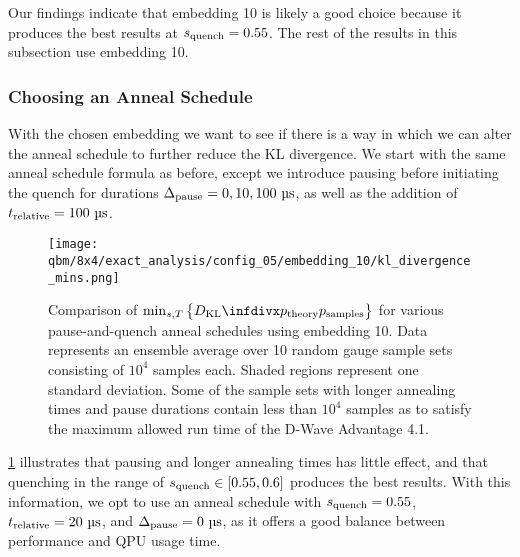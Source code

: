 Our findings indicate that embedding 10 is likely a good choice because it produces the best results at \( s_{\text{quench}} = 0.55 \).
The rest of the results in this subsection use embedding 10.

\subsubsection{Choosing an Anneal Schedule}\label{sec:choosing_an_anneal_schedule}
With the chosen embedding we want to see if there is a way in which we can alter the anneal schedule to further reduce the KL divergence.
We start with the same anneal schedule formula as before, except we introduce pausing before initiating the quench for durations \( \Deltapause = 0, 10, 100 \ \si{\micro\second} \), as well as the addition of \( t_{\text{relative}} = 100 \ \si{\micro\second} \).

\begin{figure}[!htb]
    \begin{center}
        \texttt{[image: qbm/8x4/exact\_analysis/config\_05/embedding\_10/kl\_divergence\_mins.png]}
    \end{center}
    \caption{
        Comparison of \( \min_{s,T}\big\{\DKL{\ptheory}{\psamples}\big\} \) for various pause-and-quench anneal schedules using embedding 10.
        Data represents an ensemble average over 10 random gauge sample sets consisting of \( 10^4 \) samples each.
        Shaded regions represent one standard deviation.
        Some of the sample sets with longer annealing times and pause durations contain less than \( 10^4 \) samples as to satisfy the maximum allowed run time of the D-Wave Advantage 4.1.
    }
    \label{fig:dkl_mins_embedding_05}
\end{figure}

\cref{fig:dkl_mins_embedding_05} illustrates that pausing and longer annealing times has little effect, and that quenching in the range of \( s_{\text{quench}} \in [0.55, 0.6] \) produces the best results.
With this information, we opt to use an anneal schedule with \( s_{\text{quench}} = 0.55 \), \( \trelative = 20 \ \si{\micro\second} \), and \( \Delta_{\text{pause}} = 0 \ \si{\micro\second} \), as it offers a good balance between performance and QPU usage time.

